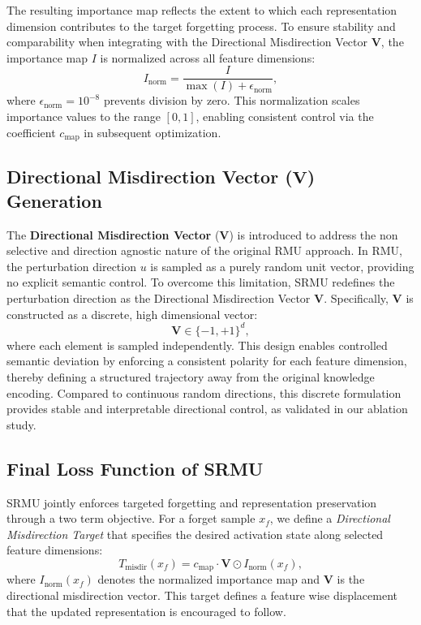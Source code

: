 The resulting importance map reflects the extent to which each representation dimension contributes to the target forgetting process.
To ensure stability and comparability when integrating with the Directional Misdirection Vector $\mathbf{V}$, the importance map $I$ is normalized across all feature dimensions:
\begin{equation}
I_{\text{norm}} = \frac{I}{\max(I) + \epsilon_{\text{norm}}},
\label{eq:normalization}
\end{equation}
where $\epsilon_{\text{norm}} = 10^{-8}$ prevents division by zero.
This normalization scales importance values to the range $[0,1]$, enabling consistent control via the coefficient $c_{\text{map}}$ in subsequent optimization.

\subsection{Directional Misdirection Vector ($\mathbf{V}$) Generation}\label{sec:vector}

The \textbf{Directional Misdirection Vector} ($\mathbf{V}$) is introduced to address the non selective and direction agnostic nature of the original RMU approach.
In RMU, the perturbation direction $u$ is sampled as a purely random unit vector, providing no explicit semantic control.
To overcome this limitation, SRMU redefines the perturbation direction as the Directional Misdirection Vector $\mathbf{V}$.
Specifically, $\mathbf{V}$ is constructed as a discrete, high dimensional vector:
\[
\mathbf{V} \in \{-1, +1\}^d,
\]
where each element is sampled independently.
This design enables controlled semantic deviation by enforcing a consistent polarity for each feature dimension, thereby defining a structured trajectory away from the original knowledge encoding. Compared to continuous random directions, this discrete formulation provides
stable and interpretable directional control, as validated in our ablation study.
\subsection{Final Loss Function of SRMU}

SRMU jointly enforces targeted forgetting and representation preservation through a two term objective.
For a forget sample $x_f$, we define a \emph{Directional Misdirection Target} that specifies the desired activation state along selected feature dimensions:
\begin{equation}
T_{\text{misdir}}(x_f) = c_{\text{map}} \cdot \mathbf{V} \odot I_{\text{norm}}(x_f),
\label{eq:misdirection_target_final}
\end{equation}
where $I_{\text{norm}}(x_f)$ denotes the normalized importance map and $\mathbf{V}$ is the directional misdirection vector.
This target defines a feature wise displacement that the updated representation is encouraged to follow.

